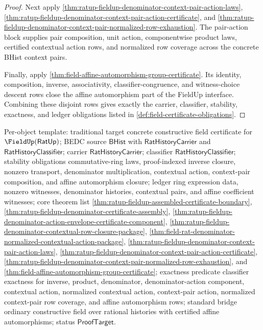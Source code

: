 \begin{proof}
Next apply \autoref{thm:ratup-fieldup-denominator-context-pair-action-laws},
\autoref{thm:ratup-fieldup-denominator-context-pair-action-certificate}, and
\autoref{thm:ratup-fieldup-denominator-context-pair-normalized-row-exhaustion}.
The pair-action block supplies pair composition, unit action, componentwise
product laws, certified contextual action rows, and normalized row coverage
across the concrete BHist context pairs.

Finally, apply \autoref{thm:field-affine-automorphism-group-certificate}. Its
identity, composition, inverse, associativity, classifier-congruence, and
witness-choice descent rows close the affine automorphism part of the FieldUp
interface. Combining these disjoint rows gives exactly the carrier,
classifier, stability, exactness, and ledger obligations listed in
\autoref{def:field-certificate-obligations}.
\end{proof}

Per-object template: traditional target concrete constructive field certificate
for $\FieldUp(\mathsf{RatUp})$; BEDC source $\mathsf{BHist}$ with
$\mathsf{RatHistoryCarrier}$ and $\mathsf{RatHistoryClassifier}$; carrier
$\mathsf{RatHistoryCarrier}$; classifier $\mathsf{RatHistoryClassifier}$;
stability obligations commutative-ring laws, proof-indexed inverse closure,
nonzero transport, denominator multiplication, contextual action, context-pair
composition, and affine automorphism closure; ledger ring expression data,
nonzero witnesses, denominator histories, contextual pairs, and affine
coefficient witnesses; core theorem list
\autoref{thm:ratup-fieldup-assembled-certificate-boundary},
\autoref{thm:ratup-fieldup-denominator-certificate-assembly},
\autoref{thm:ratup-fieldup-denominator-action-envelope-certificate-component},
\autoref{thm:ratup-fieldup-denominator-contextual-row-closure-package},
\autoref{thm:field-rat-denominator-normalized-contextual-action-package},
\autoref{thm:ratup-fieldup-denominator-context-pair-action-laws},
\autoref{thm:ratup-fieldup-denominator-context-pair-action-certificate},
\autoref{thm:ratup-fieldup-denominator-context-pair-normalized-row-exhaustion},
and
\autoref{thm:field-affine-automorphism-group-certificate}; exactness predicate
classifier exactness for inverse, product, denominator, denominator-action
component, contextual action, normalized contextual action, context-pair action,
normalized context-pair row coverage, and affine automorphism rows; standard
bridge ordinary constructive field over rational histories with certified
affine automorphisms; status $\mathsf{ProofTarget}$.
